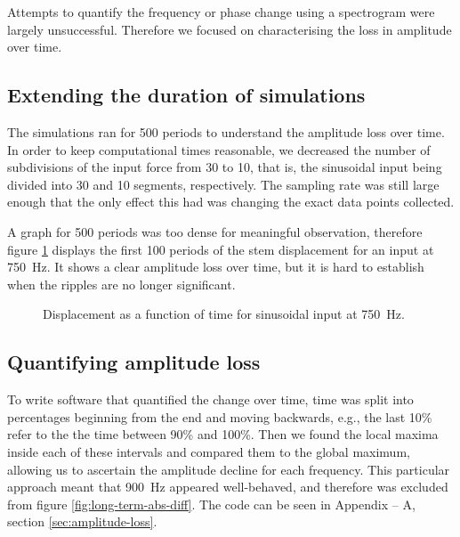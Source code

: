 Attempts to quantify the frequency or phase change using a spectrogram were largely unsuccessful.
Therefore we focused on characterising the loss in amplitude over time.

\subsection{Extending the duration of simulations}
The simulations ran for 500 periods to understand the amplitude loss over time.
In order to keep computational times reasonable, we decreased the number of subdivisions of the input force from 30 to 10, that is, the sinusoidal input being divided into 30 and 10 segments, respectively.
The sampling rate was still large enough that the only effect this had was changing the exact data points collected.

A graph for 500 periods was too dense for meaningful observation, therefore figure \ref{fig:long-term-displacement} displays the first 100 periods of the stem displacement for an input at \SI{750}{Hz}.
It shows a clear amplitude loss over time, but it is hard to establish when the ripples are no longer significant.

\begin{figure}[h] \centering
\caption[Displacement as a function of time for sinusoidal input at \SI{750}{Hz}]{Displacement as a function of time for sinusoidal input at \SI{750}{Hz}.}
\label{fig:long-term-displacement}
\end{figure}

\subsection{Quantifying amplitude loss}
To write software that quantified the change over time, time was split into percentages beginning from the end and moving backwards, e.g., the last 10\% refer to the the time between 90\% and 100\%.
Then we found the local maxima inside each of these intervals and compared them to the global maximum, allowing us to ascertain the amplitude decline for each frequency.
This particular approach meant that \SI{900}{Hz} appeared well-behaved, and therefore was excluded from figure \ref{fig:long-term-abs-diff}.  
The code can be seen in Appendix -- A, section \ref{sec:amplitude-loss}.

